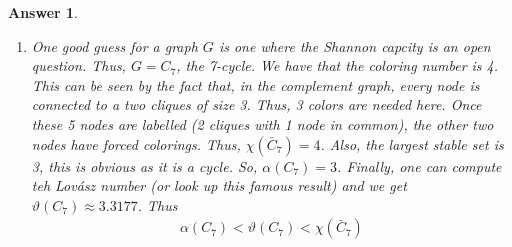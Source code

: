 \documentclass[12pt]{article}
\theoremstyle{colon}
\newtheorem*{answer}{Answer}
\begin{document}
\begin{answer}
\begin{enumerate}[label=\arabic*)]
      \begin{align*}
        \min_{Z \in \mathbb{S}^{(n+1) \times (n+1)}} \quad Z_{11} \\
        \text{s.t. } &Z_{n+1,i} = Z_{ii} = 1, i = 1, \mathellipsis, n \\
        &Z_{ij} = 0 \text{ if } \{i,j\} \in \bar{E} \\
        &Z \succeq 0
      \end{align*}
      Where we now just rotate this symmetric matrix by 180 degrees so that $Z_{11}$ becomes $Z_{n+1, n+1}$ so that the objective is of the form desired. Note that rotating doesn't do anything as it is symmetric (it only changes the variable indices). Now, we show the inequality by showing that the coloring number is feasible to this SDP. Let $k = \chi(\bar{G})$, then, by definition of coloring number, there is a partition $\{V_1, \mathellipsis, V_k\}$ such that $V_i$ is a clique. Now, we construct the $Z$ as follows. Let $e_i$ be the indicator for the set $V_i$. Then let $z_i = \begin{bmatrix} e_i \\ 1 \end{bmatrix}$. Now we define our $Z$ as
      \begin{gather*}
        Z = \sum_{\ell=1}^k z_\ell z_\ell^T = \begin{bmatrix}
          \sum_{\ell=1}^k e_\ell e_\ell^T & 1 \\
          1^T & k
        \end{bmatrix}
      \end{gather*}
      Now we check the constraints. $Z \succeq 0$ as it is the sum of square terms. If $(i,j) \in \bar{E}$, then they are in different $V_\ell$. Thus, $Z_{ij} = 0$ as $(\sum_{\ell=1}^k e_\ell e_\ell^T)_{ij} = 0$. Finally, the edge is all 1's and the diagonal is 1 as well since if $Z_ii = (\sum_{\ell=1}^k e_\ell e_\ell^T)_{ii}$, by construction, $(e_\ell e_\ell^T)_{ii} = 1$ for the partition that contains node $i$. Thus, this $Z$ is feasible and $Z_{n+1, n+1} = k$ and we conclude that $\vartheta(G) \leq k = \chi(\bar{G})$.

    \item One good guess for a graph $G$ is one where the Shannon capcity is an open question. Thus, $G = C_7$, the 7-cycle. We have that the coloring number is 4. This can be seen by the fact that, in the complement graph, every node is connected to a two cliques of size 3. Thus, 3 colors are needed here. Once these 5 nodes are labelled (2 cliques with 1 node in common), the other two nodes have forced colorings. Thus, $\chi(\bar{C}_7) = 4$. Also, the largest stable set is 3, this is obvious as it is a cycle. So, $\alpha(C_7) = 3$. Finally, one can compute teh Lov{\'a}sz number (or look up this famous result) and we get $\vartheta(C_7) \approx 3.3177$. Thus
    \begin{gather*}
      \alpha(C_7) < \vartheta(C_7) < \chi(\bar{C}_7)
    \end{gather*}
  \end{enumerate}
\end{answer}
\end{document}

